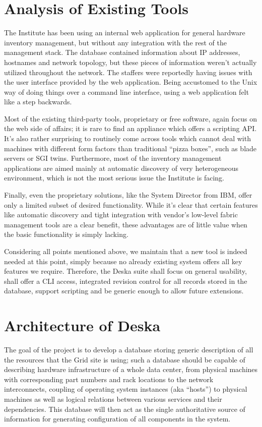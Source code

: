 \documentclass[a4paper]{jpconf}
\begin{document}
\section{Analysis of Existing Tools}

The Institute has been using an internal web application for general hardware inventory management, but without any integration with
the rest of the management stack.  The database contained information about IP addresses, hostnames and network topology, but these
pieces of information weren't actually utilized throughout the network.  The staffers were reportedly having issues with the user
interface provided by the web application.  Being accustomed to the Unix way of doing things over a command line interface, using a web
application felt like a step backwards.

Most of the existing third-party tools, proprietary or free software, again focus on the web side of affairs; it is rare to find an
appliance which offers a scripting API.  It's also rather surprising to routinely come across tools which cannot deal with machines
with different form factors than traditional ``pizza boxes'', such as blade servers or SGI twins.  Furthermore, most of the inventory
management applications are aimed mainly at automatic discovery of very heterogeneous environment, which is not the most serious issue
the Institute is facing.

Finally, even the proprietary solutions, like the System Director from IBM, offer only a limited subset of desired functionality.
While it's clear that certain features like automatic discovery and tight integration with vendor's low-level fabric management tools
are a clear benefit, these advantages are of little value when the basic functionality is simply lacking.

Considering all points mentioned above, we maintain that a new tool is indeed needed at this point, simply because no already existing
system offers all key features we require.  Therefore, the Deska suite shall focus on general usability, shall offer a CLI access,
integrated revision control for all records stored in the database, support scripting and be generic enough to allow future extensions.

\section{Architecture of Deska}

The goal of the project is to develop a database storing generic description of all the resources that the Grid site is using;
such a database should be capable of describing hardware infrastructure of a whole data center, from physical machines with
corresponding part numbers and rack locations to the network interconnects, coupling of operating system instances (aka ``hosts'') to
physical machines as well as logical relations between various services and their dependencies.  This database will then act as the
single authoritative source of information for generating configuration of all components in the system.
\end{document}
